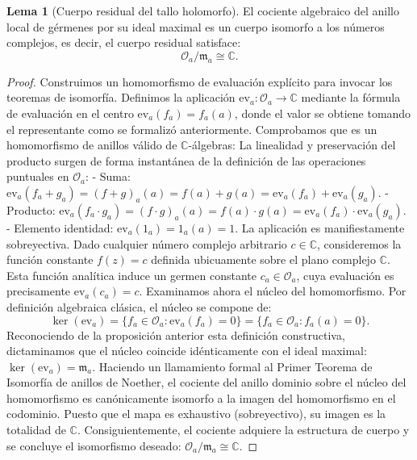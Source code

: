 \documentclass[11pt,a4paper]{article}
\theoremstyle{definition}
\newtheorem{lema}{Lema}[section]
\theoremstyle{remark}
\numberwithin{equation}{section}
\begin{document}
\begin{lema}[Cuerpo residual del tallo holomorfo]
El cociente algebraico del anillo local de gérmenes por su ideal maximal es un cuerpo isomorfo a los números complejos, es decir, el cuerpo residual satisface:
\begin{equation}
\mathcal{O}_a / \mathfrak{m}_a \cong \mathbb{C}.
\end{equation}
\end{lema}
\begin{proof}
Construimos un homomorfismo de evaluación explícito para invocar los teoremas de isomorfía. Definimos la aplicación $\text{ev}_a: \mathcal{O}_a \to \mathbb{C}$ mediante la fórmula de evaluación en el centro $\text{ev}_a(f_a) = f_a(a)$, donde el valor se obtiene tomando el representante como se formalizó anteriormente.
Comprobamos que es un homomorfismo de anillos válido de $\mathbb{C}$-álgebras:
La linealidad y preservación del producto surgen de forma instantánea de la definición de las operaciones puntuales en $\mathcal{O}_a$:
- Suma: $\text{ev}_a(f_a + g_a) = (f+g)_a(a) = f(a) + g(a) = \text{ev}_a(f_a) + \text{ev}_a(g_a)$.
- Producto: $\text{ev}_a(f_a \cdot g_a) = (f \cdot g)_a(a) = f(a) \cdot g(a) = \text{ev}_a(f_a) \cdot \text{ev}_a(g_a)$.
- Elemento identidad: $\text{ev}_a(1_a) = 1_a(a) = 1$.
La aplicación es manifiestamente sobreyectiva. Dado cualquier número complejo arbitrario $c \in \mathbb{C}$, consideremos la función constante $f(z) = c$ definida ubicuamente sobre el plano complejo $\mathbb{C}$. Esta función analítica induce un germen constante $c_a \in \mathcal{O}_a$, cuya evaluación es precisamente $\text{ev}_a(c_a) = c$.
Examinamos ahora el núcleo del homomorfismo. Por definición algebraica clásica, el núcleo se compone de:
\begin{equation}
\ker(\text{ev}_a) = \{ f_a \in \mathcal{O}_a : \text{ev}_a(f_a) = 0 \} = \{ f_a \in \mathcal{O}_a : f_a(a) = 0 \}.
\end{equation}
Reconociendo de la proposición anterior esta definición constructiva, dictaminamos que el núcleo coincide idénticamente con el ideal maximal: $\ker(\text{ev}_a) = \mathfrak{m}_a$.
Haciendo un llamamiento formal al Primer Teorema de Isomorfía de anillos de Noether, el cociente del anillo dominio sobre el núcleo del homomorfismo es canónicamente isomorfo a la imagen del homomorfismo en el codominio. Puesto que el mapa es exhaustivo (sobreyectivo), su imagen es la totalidad de $\mathbb{C}$. Consiguientemente, el cociente adquiere la estructura de cuerpo y se concluye el isomorfismo deseado: $\mathcal{O}_a / \mathfrak{m}_a \cong \mathbb{C}$.
\end{proof}
\end{document}
